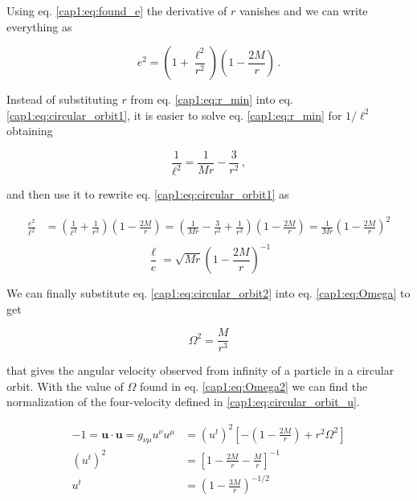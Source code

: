 Using eq. \ref{cap1:eq:found_e} the derivative of $r$ vanishes
and we can write everything as

\begin{equation}
    e^2 = \left(1 + \frac{\ell^2}{r^2} \right)
    \left(1 - \frac{2M}{r}\right) \, .
    \label{cap1:eq:circular_orbit1}
\end{equation}

Instead of substituting $r$ from eq. \ref{cap1:eq:r_min} into eq.
\ref{cap1:eq:circular_orbit1}, it is easier to solve eq. \ref{cap1:eq:r_min} for
$1 / \ell^2$ obtaining

\begin{equation}
    \frac{1}{\ell^2} = \frac{1}{M r} - \frac{3}{r^2} \, ,
\end{equation}

and then use it to rewrite eq. \ref{cap1:eq:circular_orbit1} as

\begin{align*}
    \frac{e^2}{\ell^2} &= \left(\frac{1}{\ell^2} + \frac{1}{r^2} \right)
    \left(1 - \frac{2M}{r}\right)
    = \left(\frac{1}{M r}
    - \frac{3}{r^2}
    + \frac{1}{r^2}\right)
    \left(1 - \frac{2M}{r}\right) 
    = \frac{1}{M r} \left(1
    - \frac{2 M}{r} \right)^2 \\
\end{align*}
\begin{equation}
    \frac{\ell}{e} = \sqrt{M r} \left(1
    - \frac{2 M}{r} \right)^{-1}
    \label{cap1:eq:circular_orbit2}
\end{equation}

We can finally substitute eq. \ref{cap1:eq:circular_orbit2} into eq.
\ref{cap1:eq:Omega} to get

\begin{equation}
    \Omega^2 = \frac{M}{r^3}
    \label{cap1:eq:Omega2}
\end{equation}

that gives the angular velocity observed from infinity of a particle in a
circular orbit.
With the value of $\Omega$ found in eq. \ref{cap1:eq:Omega2} we can find the
normalization of the four-velocity defined in \ref{cap1:eq:circular_orbit_u}.

\begin{align*}
    - 1 = \mathbf{u \cdot u} = g_{\nu \mu} u^\nu u^\mu
    &= (u^t)^2 \left[- \left(1 - \frac{2M}{r}\right) + r^2 \Omega^2 \right] \\
    (u^t)^2 &= \left[ 1 - \frac{2M}{r} - \frac{M}{r}\right]^{-1} \\
    u^t &= \left( 1 - \frac{3M}{r} \right)^{-1/2} \\
\end{align*}

